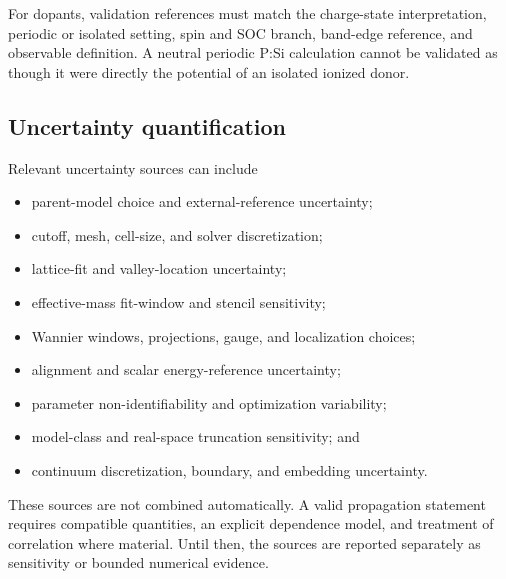 
For dopants, validation references must match the charge-state interpretation,
periodic or isolated setting, spin and SOC branch, band-edge reference, and
observable definition. A neutral periodic P:Si calculation cannot be validated
as though it were directly the potential of an isolated ionized donor.


\subsection{Uncertainty quantification}


Relevant uncertainty sources can include

\begin{itemize}
  \item parent-model choice and external-reference uncertainty;
  \item cutoff, mesh, cell-size, and solver discretization;
  \item lattice-fit and valley-location uncertainty;
  \item effective-mass fit-window and stencil sensitivity;
  \item Wannier windows, projections, gauge, and localization choices;
  \item alignment and scalar energy-reference uncertainty;
  \item parameter non-identifiability and optimization variability;
  \item model-class and real-space truncation sensitivity; and
  \item continuum discretization, boundary, and embedding uncertainty.
\end{itemize}

These sources are not combined automatically. A valid propagation statement
requires compatible quantities, an explicit dependence model, and treatment of
correlation where material. Until then, the sources are reported separately as
sensitivity or bounded numerical evidence.

